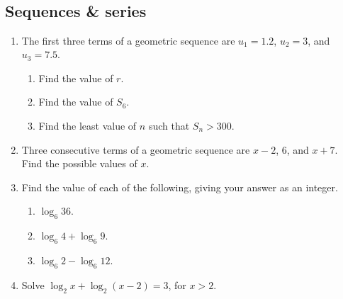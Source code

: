 \documentclass[12pt, oneside]{article}
\begin{document}
\subsection*{\\Sequences \& series}


\begin{enumerate}



\item The first three terms of a geometric sequence are $u_1=1.2$, $u_2=3$, and $u_3=7.5$.
\begin{enumerate}
    \item Find the value of $r$.
        \begin{flushright}[2]\end{flushright}
    \item Find the value of $S_6$.
        \begin{flushright}[2]\end{flushright}
    \item Find the least value of $n$
such that $S_n>300$. 
        \begin{flushright}[3]\end{flushright}
\end{enumerate}

\item Three consecutive terms of a geometric sequence are $x-2$, 6, and $x+7$.\\
Find the possible values of $x$.
    \begin{flushright}[6]\end{flushright}


\item Find the value of each of the following, giving your answer as an integer.
\begin{enumerate}
    \item $\log_6 36$.
        \begin{flushright}[2]\end{flushright}
    \item $\log_6 4 + \log_6 9$.
        \begin{flushright}[2]\end{flushright}
    \item $\log_6 2 - \log_6 12$.
        \begin{flushright}[3]\end{flushright}
\end{enumerate}

\item Solve $\log_2 x + \log_2 (x-2) = 3$, for $x>2$.
    \begin{flushright}[7]\end{flushright}


\end{enumerate}
\end{document}
